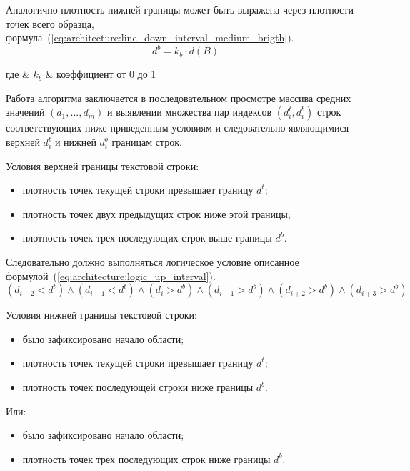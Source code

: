 Аналогично плотность нижней границы может быть выражена через плотности точек всего образца, формула~(\ref{eq:architecture:line_down_interval_medium_brigth}).
\begin{equation}
  \label{eq:architecture:line_down_interval_medium_brigth}
  d^{b} = k_{b} \cdot d(B)
\end{equation}
\begin{explanation}
где & $ k_{b} $ & коэффициент от 0 до 1
\end{explanation}

Работа алгоритма заключается в последовательном просмотре массива средних значений $ (d_1,...,d_m) $ и выявлении множества пар индексов $ (d^t_i,d^b_i) $ строк соответствующих ниже приведенным условиям и следовательно являющимися верхней $ d^t_i $ и нижней $ d^b_i $ границам строк.

Условия верхней границы текстовой строки:
\begin{itemize}
  \item плотность точек текущей строки превышает границу $ d^{t} $;
  \item плотность точек двух предыдущих строк ниже этой границы;
  \item плотность точек трех последующих строк выше границы $ d^{b} $.
\end{itemize}

Следовательно должно выполняться логическое условие описанное формулой~(\ref{eq:architecture:logic_up_interval}).
\begin{equation}
  \label{eq:architecture:logic_up_interval}
  (d_{i-2} < d^{t}) \wedge (d_{i-1} < d^{t}) \wedge (d_i > d^{b}) \wedge (d_{i+1} > d^{b}) \wedge (d_{i+2} > d^{b}) \wedge (d_{i+3} > d^{b})
\end{equation}

Условия нижней границы текстовой строки:
\begin{itemize}     
  \item было зафиксировано начало области;
  \item плотность точек текущей строки превышает границу $ d^{t} $;
  \item плотность точек последующей строки ниже границы $ d^{b} $.
\end{itemize}
     
Или:

\begin{itemize}
   \item было зафиксировано начало области;
   \item плотность точек трех последующих строк ниже границы $ d^{b} $.
\end{itemize}

